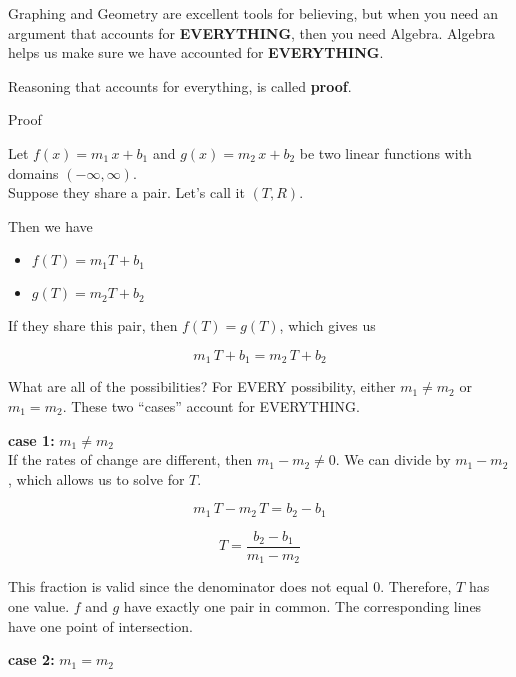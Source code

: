 \documentclass{ximera}
\begin{document}
Graphing and Geometry are excellent tools for believing, but when you need an argument that accounts for \textbf{\textcolor{purple!85!blue}{EVERYTHING}}, then you need Algebra.  Algebra helps us make sure we have accounted for \textbf{\textcolor{purple!85!blue}{EVERYTHING}}.  



Reasoning that accounts for everything, is called \textbf{proof}.














\begin{explanation} Proof 


Let $f(x) = m_1 \, x + b_1$ and $g(x) = m_2 \, x + b_2$ be two linear functions with domains $(-\infty, \infty)$. \\
Suppose they share a pair. Let's call it $(T, R)$.

Then we have 

\begin{itemize}
\item $f(T) = m_1 T + b_1$
\item $g(T) = m_2 T + b_2$
\end{itemize}

If they share this pair, then $f(T) = g(T)$, which gives us

\[     m_1 \, T + b_1 =  m_2 \, T + b_2  \]


What are all of the possibilities?  For EVERY possibility, either $m_1 \ne m_2$ or $m_1 = m_2$.  These two ``cases'' account for EVERYTHING.


\textbf{case 1:}  $m_1 \ne m_2$ \\

If the rates of change are different, then  $m_1 - m_2 \ne 0$.  We can divide by $m_1 - m_2$, which allows us to solve for $T$.

\[     m_1 \, T - m_2 \, T =  b_2 -b_1 \]


\[     T =  \frac{b_2 -b_1}{m_1 - m_2}  \]

This fraction is valid since the denominator does not equal $0$.  Therefore, $T$ has one value.  $f$ and $g$ have exactly one pair in common.  The corresponding lines have one point of intersection.



\textbf{case 2:}  $m_1 = m_2$ \\




\end{explanation}
\end{document}
